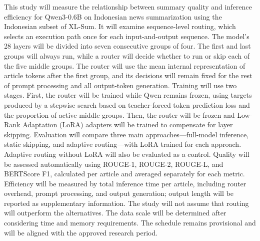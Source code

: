 \documentclass[proposal,indonesia]{ugmskripsi}
\begin{document}
This study will measure the relationship between summary quality and inference efficiency for Qwen3-0.6B on Indonesian news summarization using the Indonesian subset of XL-Sum. It will examine sequence-level routing, which selects an execution path once for each input-and-output sequence. The model's 28 layers will be divided into seven consecutive groups of four. The first and last groups will always run, while a router will decide whether to run or skip each of the five middle groups. The router will use the mean internal representation of article tokens after the first group, and its decisions will remain fixed for the rest of prompt processing and all output-token generation. Training will use two stages. First, the router will be trained while Qwen remains frozen, using targets produced by a stepwise search based on teacher-forced token prediction loss and the proportion of active middle groups. Then, the router will be frozen and Low-Rank Adaptation (LoRA) adapters will be trained to compensate for layer skipping. Evaluation will compare three main approaches—full-model inference, static skipping, and adaptive routing—with LoRA trained for each approach. Adaptive routing without LoRA will also be evaluated as a control. Quality will be assessed automatically using ROUGE-1, ROUGE-2, ROUGE-L, and BERTScore F1, calculated per article and averaged separately for each metric. Efficiency will be measured by total inference time per article, including router overhead, prompt processing, and output generation; output length will be reported as supplementary information. The study will not assume that routing will outperform the alternatives. The data scale will be determined after considering time and memory requirements. The schedule remains provisional and will be aligned with the approved research period.
\endabstracteng







\end{document}
